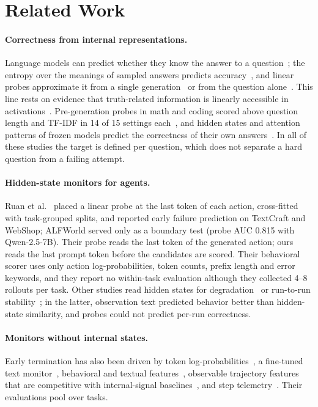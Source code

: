 \documentclass[10pt]{article}
\begin{document}
\section{Related Work}
\paragraph{Correctness from internal representations.} Language models can predict whether they know the answer to a question~\cite{kadavath2022know}; the entropy over the meanings of sampled answers predicts accuracy~\cite{kuhn2023semantic}, and linear probes approximate it from a single generation~\cite{kossen2024sep} or from the question alone~\cite{moreno2026noanswer}.
This line rests on evidence that truth-related information is linearly accessible in activations~\cite{burns2022latent,marks2023geometry}. Pre-generation probes in math and coding scored above question length and TF-IDF in 14 of 15 settings each~\cite{lugoloobi2026failures}, and hidden states and attention patterns of frozen models predict the correctness of their own answers~\cite{ghasemabadi2025gnosis}.
In all of these studies the target is defined per question, which does not separate a hard question from a failing attempt.

\paragraph{Hidden-state monitors for agents.} Ruan et al.~\cite{ruan2026doomed} placed a linear probe at the last token of each action, cross-fitted with task-grouped splits, and reported early failure prediction on TextCraft and WebShop; ALFWorld served only as a boundary test (probe AUC 0.815 with Qwen-2.5-7B). Their probe reads the last token of the generated action; ours reads the last prompt token before the candidates are scored.
Their behavioral scorer uses only action log-probabilities, token counts, prefix length and error keywords, and they report no within-task evaluation although they collected 4--8 rollouts per task.
Other studies read hidden states for degradation~\cite{khan2026companion} or run-to-run stability~\cite{mehta2026commit}; in the latter, observation text predicted behavior better than hidden-state similarity, and probes could not predict per-run correctness.

\paragraph{Monitors without internal states.} Early termination has also been driven by token log-probabilities~\cite{pham2026agentstop}, a fine-tuned text monitor~\cite{wang2026failfast}, behavioral and textual features~\cite{shi2026earlyeval}, observable trajectory features that are competitive with internal-signal baselines~\cite{pan2026monitoring}, and step telemetry~\cite{dubey2026realtime}. Their evaluations pool over tasks.
\end{document}
